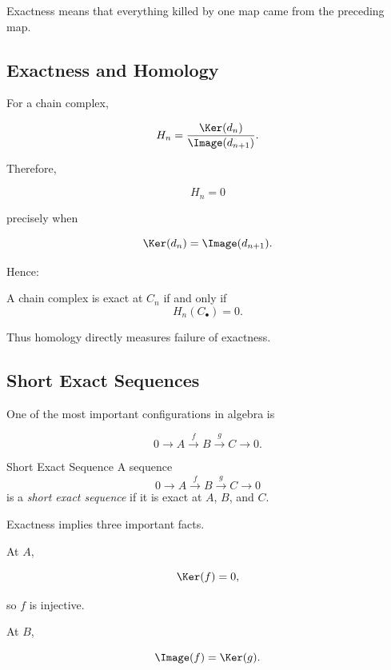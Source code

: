 Exactness means that everything killed by one map came from the preceding
map.

\subsection{Exactness and Homology}
\label{subsec:exactness-homology}

For a chain complex,

\[ H_n=\frac{\Ker(d_n)}{\Image(d_{n+1})}. \]

Therefore,

\[ H_n=0 \]

precisely when

\[ \Ker(d_n)=\Image(d_{n+1}). \]

Hence:

\begin{theorem}
A chain complex is exact at \(C_n\) if and only if
\[ H_n(C_\bullet)=0. \]
\end{theorem}

Thus homology directly measures failure of exactness.

\subsection{Short Exact Sequences}
\label{subsec:short-exact-sequences}

One of the most important configurations in algebra is

\[ 0\longrightarrow A\xrightarrow{f}B\xrightarrow{g}C\longrightarrow0. \]

\begin{definitionbox}{Short Exact Sequence}
A sequence
\[ 0\longrightarrow A\xrightarrow{f}B\xrightarrow{g}C\longrightarrow0 \]
is a \emph{short exact sequence} if it is exact at \(A\), \(B\), and \(C\).
\end{definitionbox}

Exactness implies three important facts.

At \(A\),

\[ \Ker(f)=0, \]

so \(f\) is injective.

At \(B\),

\[ \Image(f)=\Ker(g). \]


